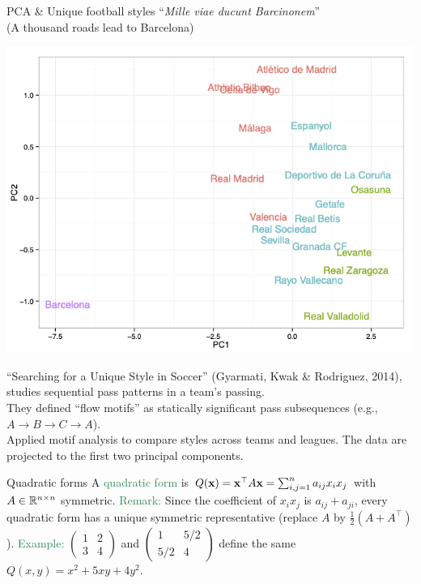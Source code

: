 \documentclass[11pt,aspectratio=169]{beamer}
\begin{document}
\begin{frame}{PCA \& Unique football styles}
``\textit{Mille viae ducunt Barcinonem}''\\ 
(A thousand roads lead to Barcelona)\\[3mm]

\begin{minipage}{7cm}
	\includegraphics[width=\textwidth]{img/tikitaka}
\end{minipage}
\begin{minipage}{8cm}
	``Searching for a Unique Style in Soccer'' (Gyarmati, Kwak \& Rodriguez, 2014), studies sequential pass patterns in a team's passing.\\[3mm]
They defined ``flow motifs'' as statically significant pass subsequences (e.g., $A\to B\to C\to A$).\\[3mm]
Applied motif analysis to compare styles across teams and leagues. The data are projected to the first two principal components.
\end{minipage}
\end{frame}


\begin{frame}{Quadratic forms}
A \textcolor{SeaGreen}{quadratic form} is $Q({\bf x})={\bf x}^\top  A{\bf x}=\sum_{i,j=1}^n a_{ij}x_ix_j$ with $A\in\mathbb R^{n\times n}$ symmetric.
\vskip 6pt
\textcolor{SeaGreen}{Remark:} Since the coefficient of $x_ix_j$ is $a_{ij}+a_{ji}$, every quadratic form has a unique symmetric representative (replace $A$ by $\tfrac{1}{2}(A+A^\top )$).
\vskip 6pt
\textcolor{SeaGreen}{Example:}
\(
\begin{pmatrix}1&2\\ 3&4\end{pmatrix}
\)
and
\(
\begin{pmatrix}1&5/2\\ 5/2&4\end{pmatrix}
\)
define the same $Q(x,y)=x^2+5xy+4y^2$.
 
\end{frame}
\end{document}
